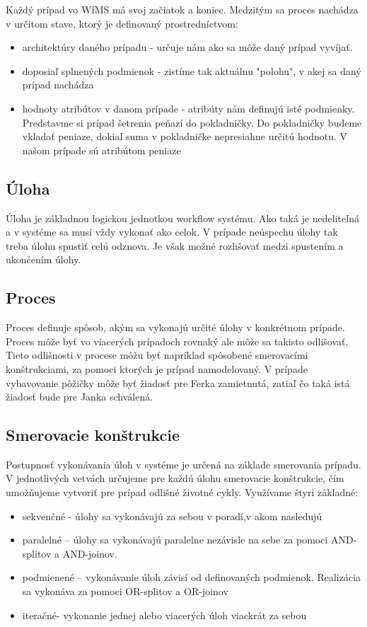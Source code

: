 


Každý prípad vo WfMS má svoj začiatok a koniec. Medzitým sa proces nachádza v určitom stave, ktorý je definovaný prostredníctvom:
\begin{itemize}
	\item architektúry daného prípadu - určuje nám ako sa môže daný prípad vyvíjať. 
	\item doposiaľ splnených podmienok - zistíme tak aktuálnu "polohu", v akej sa daný prípad nachádza 
	\item hodnoty atribútov v danom prípade - atribúty nám definujú isté podmienky. Predstavme si prípad šetrenia peňazí do pokladničky. Do pokladničky budeme vkladať peniaze, dokiaľ suma v pokladničke nepresiahne určitú hodnotu. V našom prípade sú atribútom peniaze
\end{itemize}

\subsection{Úloha}
Úloha je základnou logickou jednotkou workflow systému. Ako taká je nedeliteľná a v systéme sa musí vždy vykonať ako celok. V prípade neúspechu úlohy tak treba úlohu spustiť celú odznova. Je však možné rozlišovať medzi spustením a ukončením úlohy. 

\subsection{Proces}
Proces definuje spôsob, akým sa vykonajú určité úlohy v konkrétnom prípade. Proces môže byť vo viacerých prípadoch rovnaký ale môže sa takisto odlišovať. Tieto odlišnosti v procese môžu byť napríklad spôsobené smerovacími konštrukciami, za pomoci ktorých je prípad namodelovaný. V prípade vybavovanie pôžičky môže byť žiadosť pre Ferka zamietnutá, zatiaľ čo taká istá žiadosť bude pre Janka schválená.

\subsection{Smerovacie konštrukcie}
	Postupnosť vykonávania  úloh v systéme je určená na základe smerovania prípadu. V jednotlivých vetvách určujeme pre každú úlohu smerovacie konštrukcie, čím umožňujeme vytvoriť  pre prípad odlišné životné cykly. Využívame štyri základné: 
\begin{itemize}
	\item sekvenčné - úlohy sa vykonávajú za sebou v poradí,v akom nasledujú
	\item paralelné – úlohy sa vykonávajú paralelne nezávisle na sebe za pomoci AND-splitov a AND-joinov.
	\item podmienené – vykonávanie úloh závisí od definovaných podmienok. Realizácia sa vykonáva za pomoci OR-splitov a OR-joinov
	\item iteračné- vykonanie jednej alebo viacerých úloh viackrát za sebou
\end{itemize}

